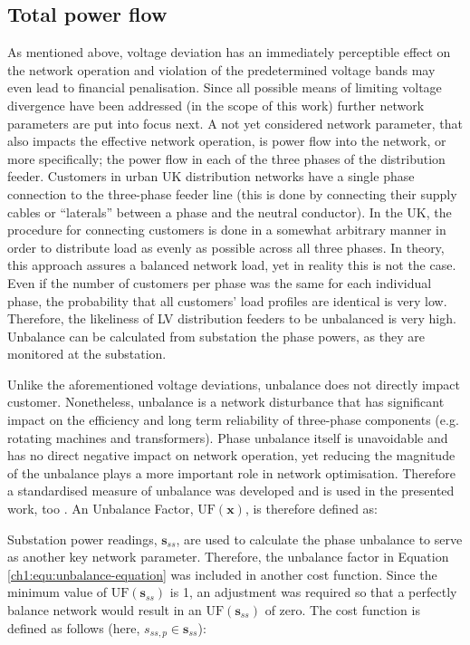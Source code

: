 

\subsection{Total power flow}
\label{ch1:subsec:total-power-flow}

As mentioned above, voltage deviation has an immediately perceptible effect on the network operation and violation of the predetermined voltage bands may even lead to financial penalisation.
Since all possible means of limiting voltage divergence have been addressed (in the scope of this work) further network parameters are put into focus next.
A not yet considered network parameter, that also impacts the effective network operation, is power flow into the network, or more specifically; the power flow in each of the three phases of the distribution feeder.
Customers in urban UK distribution networks have a single phase connection to the three-phase feeder line (this is done by connecting their supply cables or ``laterals'' between a phase and the neutral conductor).
In the UK, the procedure for connecting customers is done in a somewhat arbitrary manner in order to distribute load as evenly as possible across all three phases.
In theory, this approach assures a balanced network load, yet in reality this is not the case.
Even if the number of customers per phase was the same for each individual phase, the probability that all customers' load profiles are identical is very low.
Therefore, the likeliness of LV distribution feeders to be unbalanced is very high.
Unbalance can be calculated from substation the phase powers, as they are monitored at the substation.

Unlike the aforementioned voltage deviations, unbalance does not directly impact customer.
Nonetheless, unbalance is a network disturbance that has significant impact on the efficiency and long term reliability of three-phase components (e.g. rotating machines and transformers).
Phase unbalance itself is unavoidable and has no direct negative impact on network operation, yet reducing the magnitude of the unbalance plays a more important role in network optimisation.
Therefore a standardised measure of unbalance was developed and is used in the presented work, too \cite{ANSI-MB-1-2011}.
An Unbalance Factor, $\text{UF}(\textbf{x})$, is therefore defined as:



Substation power readings, $\textbf{s}_{ss}$, are used to calculate the phase unbalance to serve as another key network parameter.
Therefore, the unbalance factor in Equation \ref{ch1:equ:unbalance-equation} was included in another cost function.
Since the minimum value of $\text{UF}(\textbf{s}_{ss})$ is 1, an adjustment was required so that a perfectly balance network would result in an $\text{UF}(\textbf{s}_{ss})$ of zero.
The cost function is defined as follows (here, $s_{ss,p} \in \textbf{s}_{ss}$):

